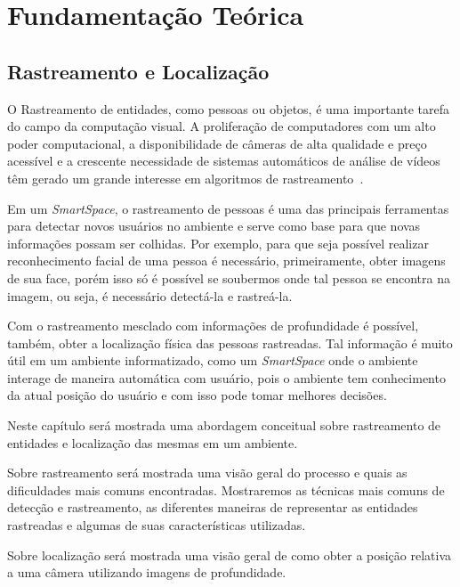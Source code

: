 \chapter{Fundamentação Teórica}

\section{Rastreamento e Localização}

	O Rastreamento de entidades, como pessoas ou objetos, é uma importante tarefa do campo da computação visual. A proliferação de computadores com um alto poder computacional, a disponibilidade de câmeras de alta qualidade e preço acessível e a crescente necessidade de sistemas automáticos de análise de vídeos têm gerado um grande interesse em algoritmos de rastreamento~\cite{yilmaz}.

	Em um \textit{SmartSpace}, o rastreamento de pessoas é uma das principais ferramentas para detectar novos usuários no ambiente e serve como base para que novas informações possam ser colhidas. Por exemplo, para que seja possível realizar reconhecimento facial de uma pessoa é necessário, primeiramente, obter imagens de sua face, porém isso só é possível se soubermos onde tal pessoa se encontra na imagem, ou seja, é necessário detectá-la e rastreá-la.

	Com o rastreamento mesclado com informações de profundidade é possível, também, obter a localização física das pessoas rastreadas. Tal informação é muito útil em um ambiente informatizado, como um \textit{SmartSpace} onde o ambiente interage de maneira automática com usuário, pois o ambiente tem conhecimento da atual posição do usuário e com isso pode tomar melhores decisões.

	Neste capítulo será mostrada uma abordagem conceitual sobre rastreamento de entidades e localização das mesmas em um ambiente.

	Sobre rastreamento será mostrada uma visão geral do processo e quais as dificuldades mais comuns encontradas. Mostraremos as técnicas mais comuns de detecção e rastreamento, as diferentes maneiras de representar as entidades rastreadas e algumas de suas características utilizadas.

	Sobre localização será mostrada uma visão geral de como obter a posição relativa a uma câmera utilizando imagens de profundidade.

	
	

